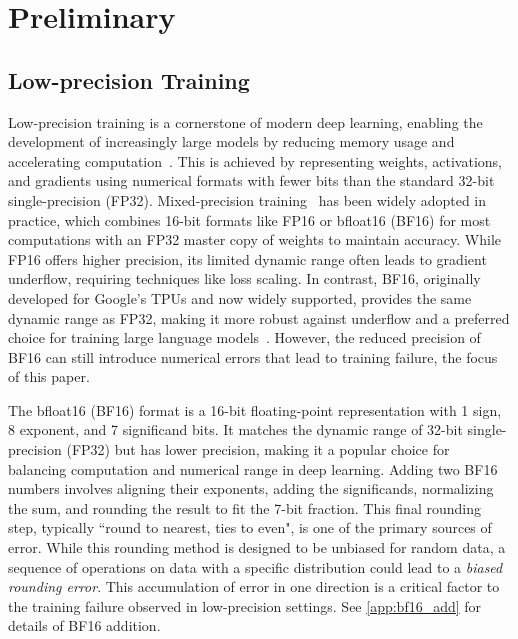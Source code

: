 \documentclass{article} %
\begin{document}
\section{Preliminary}


\subsection{Low-precision Training}

Low-precision training is a cornerstone of modern deep learning, enabling the development of increasingly large models by reducing memory usage and accelerating computation~\citep{liu2024deepseek,tseng2025training,hao2025low}. This is achieved by representing weights, activations, and gradients using numerical formats with fewer bits than the standard 32-bit single-precision (FP32). Mixed-precision training~\citep{micikevicius2017mixed} has been widely adopted in practice, which combines 16-bit formats like FP16 or bfloat16 (BF16) for most computations with an FP32 master copy of weights to maintain accuracy. While FP16 offers higher precision, its limited dynamic range often leads to gradient underflow, requiring techniques like loss scaling. In contrast, BF16, originally developed for Google's TPUs and now widely supported, provides the same dynamic range as FP32, making it more robust against underflow and a preferred choice for training large language models~\citep{kalamkar2019study, wang2019bfloat16}. However, the reduced precision of BF16 can still introduce numerical errors that lead to training failure, the focus of this paper.

The bfloat16 (BF16) format is a 16-bit floating-point representation with 1 sign, 8 exponent, and 7 significand bits. It matches the dynamic range of 32-bit single-precision (FP32) but has lower precision, making it a popular choice for balancing computation and numerical range in deep learning. Adding two BF16 numbers involves aligning their exponents, adding the significands, normalizing the sum, and rounding the result to fit the 7-bit fraction. This final rounding step, typically ``round to nearest, ties to even", is one of the primary sources of error. While this rounding method is designed to be unbiased for random data, a sequence of operations on data with a specific distribution could lead to a \emph{biased rounding error}. This accumulation of error in one direction is a critical factor to the training failure observed in low-precision settings. See \cref{app:bf16_add} for details of BF16 addition.
\end{document}
